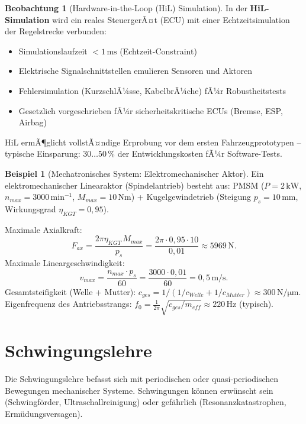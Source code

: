 ﻿\documentclass[a4paper,12pt]{report}
\theoremstyle{definition}
\newtheorem{beispiel}{Beispiel}
\newtheorem{beobachtung}{Beobachtung}
\begin{document}
\begin{beobachtung}[Hardware-in-the-Loop (HiL) Simulation]
In der \textbf{HiL-Simulation} wird ein reales SteuergerÃ¤t (ECU)
mit einer Echtzeitsimulation der Regelstrecke verbunden:
\begin{itemize}
    \item[-] Simulationslaufzeit $< 1\,\mathrm{ms}$ (Echtzeit-Constraint)
    \item[-] Elektrische Signalschnittstellen emulieren Sensoren und Aktoren
    \item[-] Fehlersimulation (KurzschlÃ¼sse, KabelbrÃ¼che) fÃ¼r Robustheitstests
    \item[-] Gesetzlich vorgeschrieben fÃ¼r sicherheitskritische ECUs (Bremse, ESP, Airbag)
\end{itemize}
HiL ermÃ¶glicht vollstÃ¤ndige Erprobung vor dem ersten Fahrzeugprototypen --
typische Einsparung: $30\ldots50\,\%$ der Entwicklungskosten fÃ¼r Software-Tests.
\end{beobachtung}

\begin{beispiel}[Mechatronisches System: Elektromechanischer Aktor]
Ein elektromechanischer Linearaktor (Spindelantrieb) besteht aus:
PMSM ($P = 2\,\mathrm{kW}$, $n_{max} = 3000\,\mathrm{min^{-1}}$, $M_{max} = 10\,\mathrm{Nm}$)
+ Kugelgewindetrieb (Steigung $p_s = 10\,\mathrm{mm}$, Wirkungsgrad $\eta_{KGT} = 0{,}95$).

Maximale Axialkraft:
\[
  F_{ax} = \frac{2\pi\eta_{KGT}\,M_{max}}{p_s} = \frac{2\pi\cdot0{,}95\cdot10}{0{,}01} \approx 5969\,\mathrm{N}.
\]
Maximale Lineargeschwindigkeit:
\[
  v_{max} = \frac{n_{max}\cdot p_s}{60} = \frac{3000\cdot0{,}01}{60} = 0{,}5\,\mathrm{m/s}.
\]
Gesamtsteifigkeit (Welle + Mutter):
$c_{ges} = 1/(1/c_{Welle} + 1/c_{Mutter}) \approx 300\,\mathrm{N/\mu m}$.
Eigenfrequenz des Antriebsstrangs:
$f_0 = \frac{1}{2\pi}\sqrt{c_{ges}/m_{eff}} \approx 220\,\mathrm{Hz}$ (typisch).
\end{beispiel}

\chapter{Schwingungslehre}

Die Schwingungslehre befasst sich mit periodischen oder quasi-periodischen
Bewegungen mechanischer Systeme. Schwingungen k\"onnen erw\"unscht sein
(Schwingf\"order, Ultraschallreinigung) oder gef\"ahrlich
(Resonanzkatastrophen, Erm\"udungsversagen).
\end{document}
